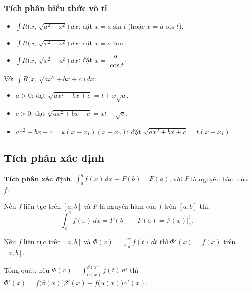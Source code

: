 \documentclass[12pt,a4paper]{article}
\begin{document}
\subsubsection{Tích phân biểu thức vô tỉ}

\begin{phuongphap}[title={Phép thế lượng giác (Euler)}]
  \begin{itemize}
    \item $\displaystyle\int R\bigl(x,\, \sqrt{a^2 - x^2}\bigr)\,dx$: đặt $x = a\sin t$ (hoặc $x = a\cos t$).
    \item $\displaystyle\int R\bigl(x,\, \sqrt{x^2 + a^2}\bigr)\,dx$: đặt $x = a\tan t$.
    \item $\displaystyle\int R\bigl(x,\, \sqrt{x^2 - a^2}\bigr)\,dx$: đặt $x = \dfrac{a}{\cos t}$.
  \end{itemize}
\end{phuongphap}

\begin{phuongphap}[title={Phép thế Euler}]
  Với $\displaystyle\int R\bigl(x,\, \sqrt{ax^2 + bx + c}\bigr)\,dx$:
  \begin{itemize}
    \item $a > 0$: đặt $\sqrt{ax^2+bx+c} = t \pm x\sqrt{a}$.
    \item $c > 0$: đặt $\sqrt{ax^2+bx+c} = xt \pm \sqrt{c}$.
    \item $ax^2+bx+c = a(x - x_1)(x - x_2)$: đặt $\sqrt{ax^2+bx+c} = t(x - x_1)$.
  \end{itemize}
\end{phuongphap}

\subsection{Tích phân xác định}

\begin{dinhnghia}
  \textbf{Tích phân xác định}: $\displaystyle\int_a^b f(x)\,dx = F(b) - F(a)$, với $F$ là nguyên hàm của $f$.
\end{dinhnghia}

\begin{dinhly}[title={Định lý cơ bản của giải tích (Newton--Leibniz)}]
  Nếu $f$ liên tục trên $[a,b]$ và $F$ là nguyên hàm của $f$ trên $[a,b]$ thì:
  \[
    \int_a^b f(x)\,dx = F(b) - F(a) = F(x)\Big|_a^b.
  \]
\end{dinhly}

\begin{dinhly}[title={Hàm tích phân có cận biến đổi}]
  Nếu $f$ liên tục trên $[a,b]$ và $\Phi(x) = \displaystyle\int_a^x f(t)\,dt$ thì $\Phi'(x) = f(x)$ trên $[a,b]$.

  Tổng quát: nếu $\Phi(x) = \displaystyle\int_{\alpha(x)}^{\beta(x)} f(t)\,dt$ thì $\Phi'(x) = f\bigl(\beta(x)\bigr)\beta'(x) - f\bigl(\alpha(x)\bigr)\alpha'(x)$.
\end{dinhly}
\end{document}
